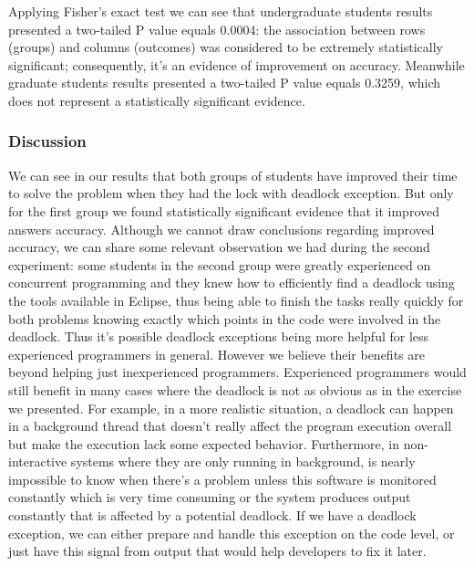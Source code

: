 Applying Fisher's exact test we can see that undergraduate students results presented a two-tailed P value equals 0.0004: the association between rows (groups) and columns (outcomes) was considered to be extremely statistically significant; consequently, it's an evidence of improvement on accuracy. Meanwhile graduate students results presented a two-tailed P value equals 0.3259, which does not represent a statistically significant evidence.


\subsubsection{Discussion}


We can see in our results that both groups of students have improved their time to solve the problem when they had the lock with deadlock exception. But only for the first group we found statistically significant evidence that it improved answers accuracy. Although we cannot draw conclusions regarding improved accuracy, we can share some relevant observation we had during the second experiment: some students in the second group were greatly experienced on concurrent programming and they knew how to efficiently find a deadlock using the tools available in Eclipse, thus being able to finish the tasks really quickly for both problems knowing exactly which points in the code were involved in the deadlock. Thus it's possible deadlock exceptions being more helpful for less experienced programmers in general. However we believe their benefits are beyond helping just inexperienced programmers. Experienced programmers would still benefit in many cases where the deadlock is not as obvious as in the exercise we presented. For example, in a more realistic situation, a deadlock can happen in a background thread that doesn't really affect the program execution overall but make the execution lack some expected behavior. Furthermore, in non-interactive systems where they are only running in background, is nearly impossible to know when there's a problem unless this software is monitored constantly which is very time consuming or the system produces output constantly that is affected by a potential deadlock. If we have a deadlock exception, we can either prepare and handle this exception on the code level, or just have this signal from output that would help developers to fix it later.

